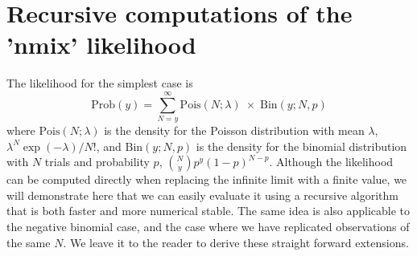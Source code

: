 \documentclass[codesnippet]{jss}
\begin{document}
\section{Recursive computations of the 'nmix' likelihood}
The likelihood for the simplest case is
\begin{displaymath}
	\text{Prob}(y) = \sum_{N = y}^{\infty}
	\text{Pois}(N ; \lambda) \;\times\; \text{Bin}(y;  N, p)
\end{displaymath}
where $\text{Pois}(N; \lambda)$ is the density for the Poisson distribution with mean $\lambda$, $\lambda^{N}\exp(-\lambda)/N!$, and $\text{Bin}(y; N, p)$ is the density for the binomial distribution with $N$ trials and probability $p$, ${N \choose y} p^{y}(1-p)^{N-p}$. Although the likelihood can be computed directly when replacing the infinite limit with a finite value, we will demonstrate here that we can easily evaluate it using a recursive algorithm that is both faster and more numerical stable. The same idea is also applicable to the negative binomial case, and the case where we have replicated observations of the same $N$. We leave it to the reader to derive these straight forward extensions.
\end{document}
